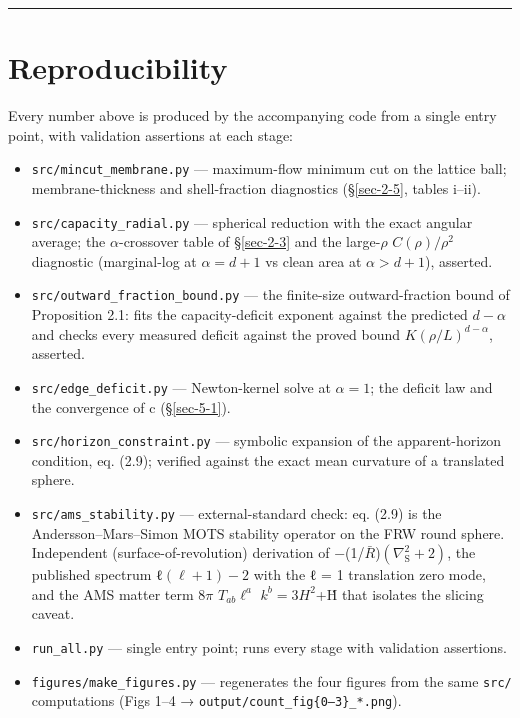 \documentclass[aps,prd,preprint,nofootinbib,superscriptaddress]{revtex4-2}
\providecommand{\tightlist}{\setlength{\itemsep}{0pt}\setlength{\parskip}{0pt}}
\begin{document}
\begin{center}\rule{0.5\linewidth}{0.5pt}\end{center}

\section*{Reproducibility}\label{reproducibility}

Every number above is produced by the accompanying code from a single
entry point, with validation assertions at each stage:

\begin{itemize}
\tightlist
\item
  \texttt{src/\allowbreak mincut\_\allowbreak membrane.\allowbreak py} --- maximum-flow minimum cut on the
  lattice ball; membrane-thickness and shell-fraction diagnostics
  (§\ref{sec-2-5}, tables i--ii).
\item
  \texttt{src/\allowbreak capacity\_\allowbreak radial.\allowbreak py} --- spherical reduction with the
  exact angular average; the \(\alpha\)-crossover table of
  §\ref{sec-2-3} and the large-\(\rho\) \(C(\rho )/\rho ^{2}\)
  diagnostic (marginal-log at \(\alpha  = d + 1\) vs clean area at
  \(\alpha  > d + 1\)), asserted.
\item
  \texttt{src/\allowbreak outward\_\allowbreak fraction\_\allowbreak bound.\allowbreak py} --- the finite-size
  outward-fraction bound of Proposition 2.1: fits the capacity-deficit
  exponent against the predicted \(d - \alpha\) and checks every
  measured deficit against the proved bound \(K(\rho /L)^{d-\alpha }\),
  asserted.
\item
  \texttt{src/\allowbreak edge\_\allowbreak deficit.\allowbreak py} --- Newton-kernel solve at
  \(\alpha  = 1\); the deficit law and the convergence of c
  (§\ref{sec-5-1}).
\item
  \texttt{src/\allowbreak horizon\_\allowbreak constraint.\allowbreak py} --- symbolic expansion of the
  apparent-horizon condition, eq. (2.9); verified against the exact mean
  curvature of a translated sphere.
\item
  \texttt{src/\allowbreak ams\_\allowbreak stability.\allowbreak py} --- external-standard check: eq. (2.9)
  is the Andersson--Mars--Simon MOTS stability operator on the FRW round
  sphere. Independent (surface-of-revolution) derivation of
  −(1/\(\bar{R}\))\((\nabla ^{2}_{\mathrm{S}} + 2)\), the published
  spectrum ℓ\((\ell +1) - 2\) with the ℓ = 1 translation zero mode, and
  the AMS matter term \(8\pi\) \(T_{ab}\ell ^{a}\) \(k^{b} = 3H^{2}\)+Ḣ
  that isolates the slicing caveat.
\item
  \texttt{run\_\allowbreak all.\allowbreak py} --- single entry point; runs every stage with
  validation assertions.
\item
  \texttt{figures/\allowbreak make\_\allowbreak figures.\allowbreak py} --- regenerates the four figures
  from the same \texttt{src/\allowbreak } computations (Figs 1--4 →
  \texttt{output/count\_fig\{0–3\}\_*.png}).
\end{itemize}
\end{document}
